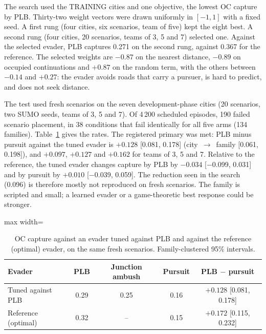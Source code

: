 \documentclass[preprint,12pt]{elsarticle}
\begin{document}
The search used the TRAINING cities and one objective, the lowest OC capture by PLB. Thirty-two weight vectors were
drawn uniformly in $[-1,1]$ with a fixed seed. A first rung (four cities, six scenarios, team of five) kept the eight
best. A second rung (four cities, 20 scenarios, teams of 3, 5 and 7) selected one. Against the selected evader, PLB
captures 0.271 on the second rung, against 0.367 for the reference. The selected weights are $-0.87$ on the nearest
distance, $-0.89$ on occupied continuations and $+0.87$ on the random term, with the others between $-0.14$ and
$+0.27$: the evader avoids roads that carry a pursuer, is hard to predict, and does not seek distance.

The test used fresh scenarios on the seven development-phase cities (20 scenarios, two SUMO seeds, teams of 3, 5 and
7). Of 4\,200 scheduled episodes, 190 failed scenario placement, in 38 conditions that fail identically for all five
arms (134 families). Table~\ref{tab:s-tuned} gives the rates. The registered primary was met: PLB minus pursuit against
the tuned evader is $+0.128$ [0.081, 0.178] (city~$\to$~family [0.061, 0.198]), and $+0.097$, $+0.127$ and $+0.162$
for teams of 3, 5 and 7. Relative to the reference, the tuned evader changes capture by PLB by $-0.034$
[$-$0.099, 0.031] and by pursuit by $+0.010$ [$-$0.039, 0.059]. The reduction seen in the search (0.096) is therefore
mostly not reproduced on fresh scenarios. The family is scripted and small; a learned evader or a game-theoretic best
response could be stronger.

\begin{table}[!h]
\centering
\caption{OC capture against an evader tuned against PLB and against the reference (optimal) evader, on the same fresh
scenarios. Family-clustered 95\% intervals.}
\label{tab:s-tuned}
\begin{adjustbox}{max width=\textwidth}
\begin{tabular}{@{}lcccc@{}}
\toprule
Evader & PLB & Junction ambush & Pursuit & PLB $-$ pursuit \\
\midrule
Tuned against PLB & 0.29 & 0.25 & 0.16 & $+0.128$ [0.081, 0.178] \\
Reference (optimal) & 0.32 & -- & 0.15 & $+0.172$ [0.115, 0.232] \\
\bottomrule
\end{tabular}
\end{adjustbox}
\end{table}

\end{document}
